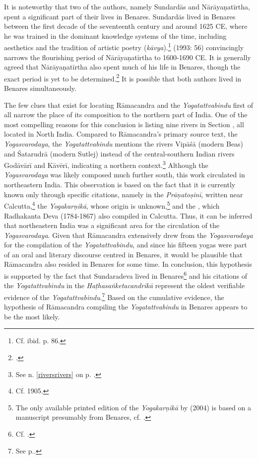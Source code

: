 It is noteworthy that two of the authors, namely Sundardās and Nārāyaṇatīrtha, spent a significant part of their lives in Benares. Sundardās lived in Benares between the first decade of the seventeenth century and around 1625 CE, where he was trained in the dominant knowledge systems of the time, including aesthetics and the tradition of artistic poetry (\textit{kāvya}).\footnote{Cf. ibid. p. 86.} \citeauthor{endo1993} (1993: 56) convincingly narrows the flourishing period of Nārāyaṇatīrtha to 1600-1690 CE. It is generally agreed that Nārāyaṇatīrtha also spent much of his life in Benares, though the exact period is yet to be determined.\footnote{\citeauthor[2004: 24]{penna2004}.} It is possible that both authors lived in Benares simultaneously.

The few clues that exist for locating Rāmacandra and the \textit{Yogatattvabindu} first of all narrow the place of its composition to the northern part of India. One of the most compelling reasons for this conclusion is listing nine rivers in Section , all located in North India. Compared to Rāmacandra's primary source text, the \textit{Yogasvarodaya}, the \emph{Yogatattvabindu} mentions the rivers Vipāśā (modern Beas) and Śatarudrā (modern Sutlej) instead of the central-southern Indian rivers Godāvārī and Kāvērī, indicating a northern context.\footnote{See n. \ref{riversrivers} on p. \pageref{riversrivers}.} Although the \emph{Yogasvarodaya} was likely composed much further south, this work circulated in northeastern India. This observation is based on the fact that it is currently known only through specific citations, namely in the \textit{Prāṇatoṣinī}, written near Calcutta,\footnote{Cf. \citeauthor{shastri1905} 1905.} the \emph{Yogakarṇikā}, whose origin is unknown,\footnote{The only available printed edition of the \emph{Yogakarṇikā} by \citeauthor{yogakarnika} (2004) is based on a manuscript presumably from Benares, cf. \citeauthor[2004: ]{yogakarnika}.} and the , which Radhakanta Deva (1784-1867) also compiled in Calcutta. Thus, it can be inferred that northeastern India was a significant area for the circulation of the \textit{Yogasvarodaya}.
Given that Rāmacandra extensively drew from the \textit{Yogasvarodaya} for the compilation of the \textit{Yogatattvabindu}, and since his fifteen yogas were part of an oral and literary discourse centred in Benares, it would be plausible that Rāmacandra also resided in Benares for some time. In conclusion, this hypothesis is supported by the fact that Sundaradeva lived in Benares\footnote{Cf. \citeauthor[2018: 123]{birch2018proliferation}.} and his citations of the \emph{Yogatattvabindu} in the \emph{Haṭhasaṅketacandrikā} represent the oldest verifiable evidence of the \emph{Yogatattvabindu}.\footnote{See p.\pageref{dating}.} Based on the cumulative evidence, the hypothesis of Rāmacandra compiling the \emph{Yogatattvabindu} in Benares appears to be the most likely.

